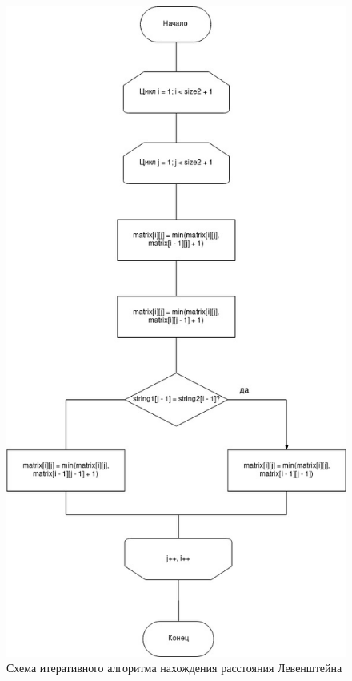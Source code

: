 \documentclass[12pt]{report}
\begin{document}
\begin{figure}[h]
	\centering
	\includegraphics[scale=0.6]{iter.jpg}
	\caption{Схема итеративного алгоритма нахождения расстояния Левенштейна}
	\label{fig:mpr}
\end{figure}
\end{document}
